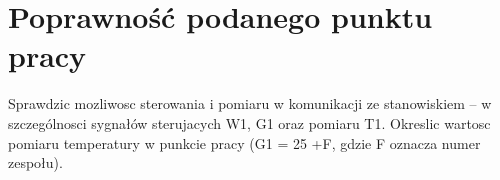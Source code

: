 \section{Poprawność podanego punktu pracy}
\label{lab:zad1}

Sprawdzic mozliwosc sterowania i pomiaru w komunikacji ze stanowiskiem – w szczególnosci
sygnałów sterujacych W1, G1 oraz pomiaru T1. Okreslic wartosc pomiaru
temperatury w punkcie pracy (G1 = 25 +F, gdzie F oznacza numer zespołu).


%    



\newpage
